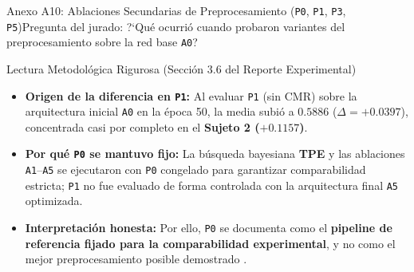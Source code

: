 \begin{frame}{Anexo A10: Ablaciones Secundarias de Preprocesamiento (\texttt{P0}, \texttt{P1}, \texttt{P3}, \texttt{P5})}{Pregunta del jurado: ?`Qu\'e ocurri\'o cuando probaron variantes del preprocesamiento sobre la red base \texttt{A0}?}
  \vspace{1.5mm}
  \begin{block}{Lectura Metodol\'ogica Rigurosa (Secci\'on 3.6 del Reporte Experimental)}
    \scriptsize
    \begin{itemize}\setlength{\itemsep}{2.5pt}
      \item \textbf{Origen de la diferencia en \texttt{P1}:} Al evaluar \texttt{P1} (sin CMR) sobre la arquitectura inicial \texttt{A0} en la \'epoca 50, la media subi\'o a $\mathbf{0.5886}$ ($\Delta = +0.0397$), concentrada casi por completo en el \textbf{Sujeto 2 ($\mathbf{+0.1157}$)}.
      \item \textbf{Por qu\'e \texttt{P0} se mantuvo fijo:} La b\'usqueda bayesiana \textbf{TPE} y las ablaciones \texttt{A1}--\texttt{A5} se ejecutaron con \texttt{P0} congelado para garantizar comparabilidad estricta; \texttt{P1} no fue evaluado de forma controlada con la arquitectura final \texttt{A5} optimizada.
      \item \textbf{Interpretaci\'on honesta:} Por ello, \texttt{P0} se documenta como el \textbf{pipeline de referencia fijado para la comparabilidad experimental}, y no como el mejor preprocesamiento posible demostrado \cite{rodas_valencia_tpe_ecog}. \hfill\hyperlink{anexo:indice_extra}{}
    \end{itemize}
  \end{block}
\end{frame}


